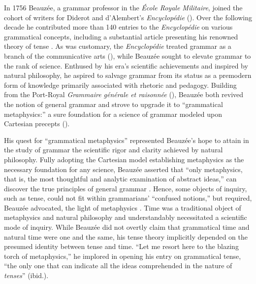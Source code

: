 \documentclass[output=paper]{langsci/langscibook}
\begin{document}
 In 1756 Beauzée, a grammar professor in the \textit{École Royale Militaire}, joined the cohort of writers for Diderot and d’Alembert’s \textit{Encyclopédie} (\citealt{le_guern_nicolas_2009}). Over the following decade he contributed more than 140 entries to the \textit{Encyclopédie} on various grammatical concepts, including a substantial article presenting his renowned theory of tense \citep{beauzee_tems_1765}. As was customary, the \textit{Encyclopédie} treated grammar as a branch of the communicative arts (\citealt{dalembert_systeme_1751}), while Beauzée sought to elevate grammar to the rank of science. Enthused by his era’s scientific achievements and inspired by natural philosophy, he aspired to salvage grammar from its status as a premodern form of knowledge primarily associated with rhetoric and pedagogy. Building from the Port-Royal \textit{Grammaire générale et raisonnée} (\citealt{arnauld_grammaire_1660}), Beauzée both revived the notion of general grammar and strove to upgrade it to “grammatical metaphysics:” a sure foundation for a science of grammar modeled upon Cartesian precepts (\citealt{chalozin-dovrat_grammar_2019}).
 
 His quest for “grammatical metaphysics” represented Beauzée’s hope to attain in the study of grammar the scientific rigor and clarity achieved by natural philosophy. Fully adopting the Cartesian model establishing metaphysics as the necessary foundation for any science, Beauzée asserted that “only metaphysics, that is, the most thoughtful and analytic examination of abstract ideas,” can discover the true principles of general grammar \citep[vol.1: xxxiij–xxxv]{beauzee_grammaire_1767}. Hence, some objects of inquiry, such as tense, could not fit within grammarians’ “confused notions,” but required, Beauzée advocated, the light of metaphysics \citep[96]{beauzee_grammaire_1767}. Time was a traditional object of metaphysics and natural philosophy and understandably necessitated a scientific mode of inquiry. While Beauzée did not overtly claim that grammatical time and natural time were one and the same, his tense theory implicitly depended on the presumed identity between tense and time. “Let me resort here to the blazing torch of metaphysics,” he implored in opening his entry on grammatical tense, “the only one that can indicate all the ideas comprehended in the nature of \textit{tenses}” (ibid.).
 
\end{document}
